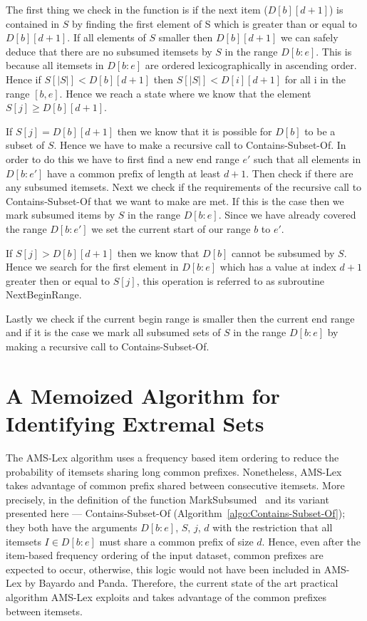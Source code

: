\documentclass[13pt,a4paper]{article}
\begin{document}
The first thing we check in the function is if the next item ($D[b][d+1]$) is contained in $S$ by finding the first element of S which is greater than or equal to $D[b][d+1]$. 
If all elements of $S$ smaller then $D[b][d+1]$ we can safely deduce that there are no subsumed itemsets by $S$ in the range $D[b:e]$. 
This is because all itemsets in $D[b:e]$ are ordered lexicographically in ascending order. Hence if $S[\lvert S\lvert] < D[b][d+1]$ then 
$S[\lvert S\lvert] < D[i][d+1]$ for all i in the range $[b,e]$. Hence we reach a state where we know that the element $S[j] \geq D[b][d+1]$.

If $S[j]=D[b][d+1]$ then we know that it is possible for $D[b]$ to be a subset of $S$. 
Hence we have to make a recursive call to Contains-Subset-Of. In order to do this we have to first find a new end range $e'$ such that all elements in $D[b:e']$ have a common prefix of length at least $d+1$. Then  
check if there are any subsumed itemsets. Next we check if the requirements of the recursive call to Contains-Subset-Of that we want to make are met. If this is the case then we mark 
subsumed items by $S$ in the range $D[b:e]$. Since we have already covered the range $D[b:e']$ we set the current start of our range $b$ to $e'$.

If $S[j]>D[b][d+1]$ then we know that $D[b]$ cannot be subsumed by $S$. Hence we search for the first element in $D[b:e]$ which has a value at index $d+1$ greater then or equal to $S[j]$, this operation is referred to as 
subroutine NextBeginRange.

Lastly we check if the current begin range is smaller then the current end range and if it is the case we mark all subsumed sets of $S$ in the range $D[b:e]$ by making a recursive call to Contains-Subset-Of.






\section{A Memoized Algorithm for Identifying Extremal Sets}
\label{sec:memoized}

The AMS-Lex \cite{BayardoPanda11} algorithm uses a frequency based item ordering to reduce the probability of itemsets sharing long common prefixes. Nonetheless, AMS-Lex takes advantage of common prefix shared between consecutive itemsets. More precisely, in the definition of the function MarkSubsumed~\cite{BayardoPanda11} and its variant presented here --- Contains-Subset-Of (Algorithm~\ref{algo:Contains-Subset-Of}); they both have the arguments $D[b:e]$, $S$, $j$, $d$ with the restriction that all itemsets $I \in D[b:e]$ must share a common prefix of size $d$. Hence, even after the item-based frequency ordering of the input dataset, common prefixes are expected to occur, otherwise, this logic would not have been included in AMS-Lex by Bayardo and Panda. Therefore, the current state of the art practical algorithm AMS-Lex exploits and takes advantage of the common prefixes between itemsets.
\end{document}
